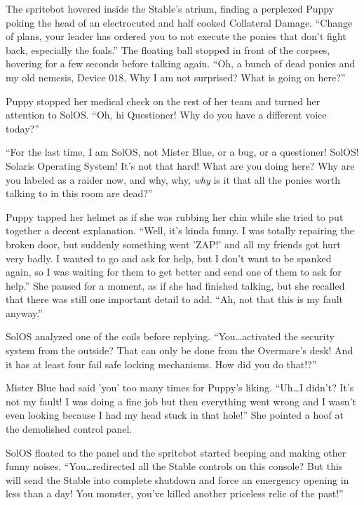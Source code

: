 \horizonline


The spritebot hovered inside the Stable's atrium, finding a perplexed Puppy poking the head of an electrocuted and half cooked Collateral Damage. ``Change of plans, your leader has ordered you to not execute the ponies that don't fight back, especially the foals.'' The floating ball stopped in front of the corpses, hovering for a few seconds before talking again. ``Oh, a bunch of dead ponies and my old nemesis, Device 018. Why I am not surprised? What is going on here?''

Puppy stopped her medical check on the rest of her team and turned her attention to SolOS. ``Oh, hi Questioner! Why do you have a different voice today?''

``For the last time, I am SolOS, not Mister Blue, or a bug, or a questioner! SolOS! Solaris Operating System! It's not that hard! What are you doing here? Why are you labeled as a raider now, and why, why, \emph{why} is it that all the ponies worth talking to in this room are dead?''

Puppy tapped her helmet as if she was rubbing her chin while she tried to put together a decent explanation. ``Well, it's kinda funny. I was totally repairing the broken door, but suddenly something went 'ZAP!' and all my friends got hurt very badly. I wanted to go and ask for help, but I don't want to be spanked again, so I was waiting for them to get better and send one of them to ask for help.'' She paused for a moment, as if she had finished talking, but she recalled that there was still one important detail to add. ``Ah, not that this is my fault anyway.''

SolOS analyzed one of the coils before replying. ``You\dots activated the security system from the outside? That can only be done from the Overmare's desk! And it has at least four fail safe locking mechanisms. How did you do that!?''

Mister Blue had said 'you' too many times for Puppy's liking. ``Uh\dots I didn't? It's not my fault! I was doing a fine job but then everything went wrong and I wasn't even looking because I had my head stuck in that hole!'' She pointed a hoof at the demolished control panel.

SolOS floated to the panel and the spritebot started beeping and making other funny noises. ``You\dots redirected all the Stable controls on this console? But this will send the Stable into complete shutdown and force an emergency opening in less than a day! You monster, you've killed another priceless relic of the past!''

